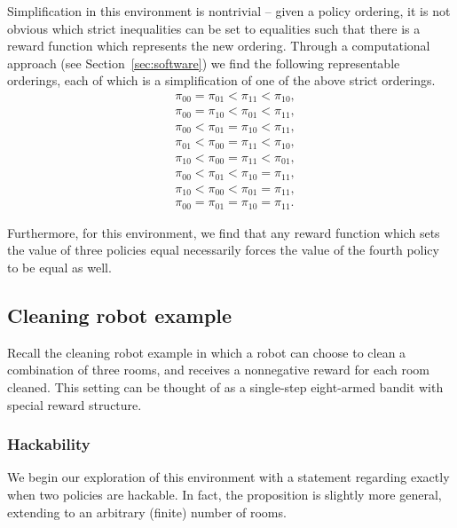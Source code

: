 Simplification in this environment is nontrivial
-- given a policy ordering, it is not obvious which strict inequalities can be set to equalities such that there is a reward function which represents the new ordering. Through a computational approach (see Section~\ref{sec:software}) we find the following representable orderings, each of which is a simplification of one of the above strict orderings.
\begin{align*}
    & \pi_{00} = \pi_{01} < \pi_{11} < \pi_{10}, \\ %
    & \pi_{00} = \pi_{10} < \pi_{01} < \pi_{11}, \\ %
    & \pi_{00} < \pi_{01} = \pi_{10} < \pi_{11}, \\ %
    & \pi_{01} < \pi_{00} = \pi_{11} < \pi_{10}, \\ %
    & \pi_{10} < \pi_{00} = \pi_{11} < \pi_{01}, \\ %
    & \pi_{00} < \pi_{01} < \pi_{10} = \pi_{11}, \\ %
    & \pi_{10} < \pi_{00} < \pi_{01} = \pi_{11}, \\ %
    & \pi_{00} = \pi_{01} = \pi_{10} = \pi_{11}.
\end{align*}

Furthermore, for this environment, we find that any reward function which sets the value of three policies equal necessarily forces the value of the fourth policy to be equal as well.



\subsection{Cleaning robot example}

Recall the cleaning robot example in which a robot can choose to clean a combination of three rooms, and receives a nonnegative reward for each room cleaned. This setting can be thought of as a single-step eight-armed bandit with special reward structure.

\subsubsection{Hackability}

We begin our exploration of this environment with a statement regarding exactly when two policies are hackable. In fact, the proposition is slightly more general, extending to an arbitrary (finite) number of rooms.
 
